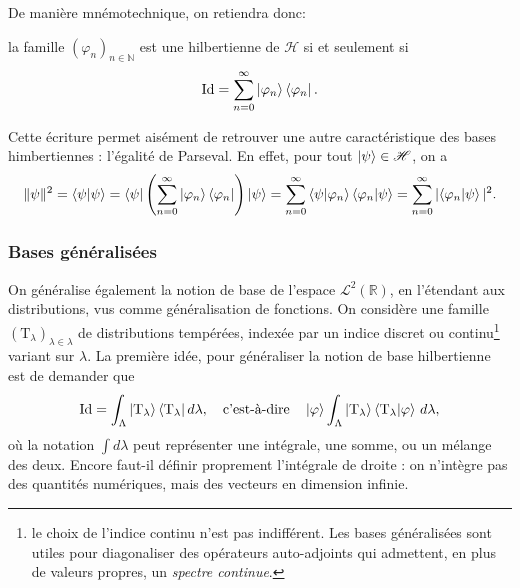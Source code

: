 \smallskip

De manière mnémotechnique, on retiendra donc:

\begin{Theo} la famille $(\varphi_n)_{n \in \mathbb N}$ est une hilbertienne de $\mathscr H$ si et seulement si 
    \begin{eqnarray}
        \mathrm{Id} = \sum_{n = 0}^{\infty} \ket{\varphi_n}\bra{\varphi_n}.
    \end{eqnarray}
\end{Theo}
Cette écriture permet aisément de retrouver une autre caractéristique des bases himbertiennes : l'égalité de Parseval. En effet, pour tout $\ket{\psi} \in \mathscr H$, on a
\begin{eqnarray}
    \Vert \psi \Vert^2 = \braket{\psi \vert \psi} = \bra{\psi} \left ( \sum_{n = 0}^{\infty} \ket{\varphi_n}\bra{\varphi_n} \right ) \ket{ \psi } = \sum_{n = 0}^\infty \braket{ \psi \vert \varphi_n } \braket{ \varphi_n  \vert \psi } = \sum_{n = 0}^{\infty} \vert\!\braket{ \varphi_n \vert \psi } \vert ^2.
\end{eqnarray}

\subsubsection{Bases généralisées}

On généralise également la notion de base de l'espace $\mathcal L^2 (\mathbb R)$, en l'étendant aux distributions, vus comme généralisation de fonctions. On considère une famille $( \mathrm T_\lambda)_{\lambda \in \lambda}$ de distributions tempérées, indexée par un indice discret ou continu\footnote{le choix de l'indice continu n'est pas indifférent. Les bases généralisées sont utiles pour \guillemotleft{}diagonaliser\guillemotright{} des opérateurs auto-adjoints qui admettent, en plus de valeurs propres, un {\em spectre continue}.} variant sur $\lambda$. La première idée, pour généraliser la notion de base hilbertienne est de demander que 
\begin{eqnarray}
    \mathrm{Id} = \int_\Lambda \ket{\mathrm T_\lambda}\bra{\mathrm T_\lambda} d \lambda , \quad  \mbox{c'est-à-dire} \quad \ket{\varphi} \int_\Lambda \ket{ \mathrm T_\lambda } \braket{\mathrm T _\lambda \vert \varphi} \, d \lambda, 
\end{eqnarray}
où la notation  $\int d\lambda $ peut représenter une intégrale, une somme, ou un mélange des deux. Encore faut-il définir proprement l'intégrale de droite : on n'intègre pas des quantités numériques, mais des vecteurs en dimension infinie.

